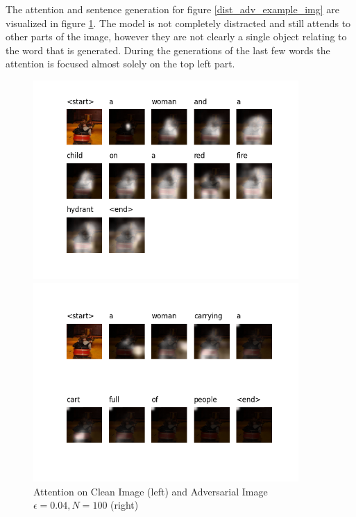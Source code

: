 The attention and sentence generation for figure \ref{dist_adv_example_img} are visualized in figure \ref{adv_example_att}. The model is not completely distracted and still attends to other parts of the image, however they are not clearly a single object relating to the word that is generated. During the generations of the last few words the attention is focused almost solely on the top left part.

\begin{figure}
    \centering
    \begin{minipage}{0.45\textwidth}
        \centering
        \includegraphics[width=0.9\textwidth]{figures/caption_distraction_adv_sample_0.png} %
    \end{minipage}\hfill
    \begin{minipage}{0.45\textwidth}
        \centering
        \includegraphics[width=0.9\textwidth]{figures/caption_distraction_adv_sample_0.04.png} %
    \end{minipage}
    \caption{Attention on Clean Image (left) and Adversarial Image $\epsilon=0.04, N=100$ (right)}
    \label{adv_example_att}
\end{figure}


